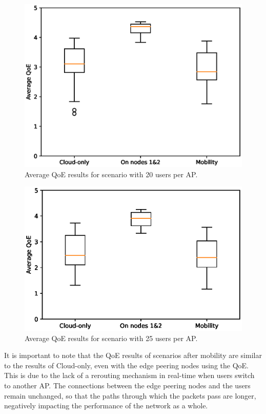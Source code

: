 \begin{figure}[!h]
    \centering
    \includegraphics[width=\linewidth]{images/QoEBoxplot-20u.eps}
    \vspace{-0.9cm}
    \caption{Average QoE results for scenario with 20 users per AP.}
    \label{fig:exp-boxplot-20}
\end{figure}

\begin{figure}[!h]
    \centering
    \includegraphics[width=\linewidth]{images/QoEBoxplot-25u.eps}
    \vspace{-0.9cm}
    \caption{Average QoE results for scenario with 25 users per AP.}
    \label{fig:exp-boxplot-25}
\end{figure}


It is important to note that the QoE results of scenarios after mobility are similar to the results of Cloud-only, even with the edge peering nodes using the QoE. This is due to the lack of a rerouting mechanism in real-time when users switch to another AP. The connections between the edge peering nodes and the users remain unchanged, so that the paths through which the packets pass are longer, negatively impacting the performance of the network as a whole.

